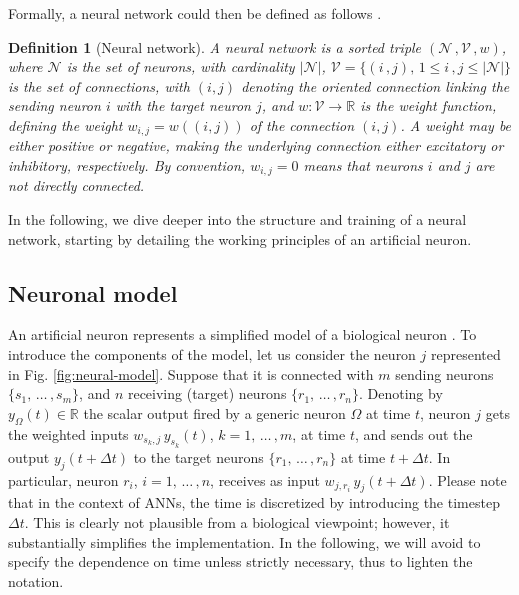 \documentclass{elsarticle}
\numberwithin{equation}{section}
\theoremstyle{theorem}
\theoremstyle{definition}
\newtheorem{definition}{Definition}[section]
\theoremstyle{remark}
\theoremstyle{proposition}
\numberwithin{figure}{section}
\begin{document}
		Formally, a neural network could then be defined as follows \cite{Kri07}.
		
		\begin{definition}[Neural network]
			\label{def:neural-network}
			\emph{
			A \emph{neural network} is a sorted triple $\left( \mathcal{N} \, , \mathcal{V} \, , w \right)$, where $\mathcal{N}$ is the set of \emph{neurons}, with cardinality $|\mathcal{N}|$, $\mathcal{V} = \big\lbrace (i \, , j), \, 1 \leq i \, , j  \leq |\mathcal{N}| \big\rbrace$ is the set of \emph{connections}, with $(i,j)$ denoting the oriented connection linking the sending neuron $i$ with the target neuron $j$, and $w : \mathcal{V} \rightarrow \mathbb{R}$ is the \emph{weight function}, defining the weight $w_{i,j} = w((i,j))$ of the connection $(i,j)$. A weight may be either positive or negative, making the underlying connection either excitatory or inhibitory, respectively. By convention, $w_{i,j} = 0$ means that neurons $i$ and $j$ are not directly connected.
			}
		\end{definition}
		
		\noindent In the following, we dive deeper into the structure and training of a neural network, starting by detailing the working principles of an artificial neuron.  
		
				
											
	\subsection{Neuronal model}
	\label{section:Neuronal model}
	
		An artificial neuron represents a simplified model of a biological neuron \cite{Kri07}. To introduce the components of the model, let us consider the neuron $j$ represented in Fig. \ref{fig:neural-model}. Suppose that it is connected with $m$ sending neurons $\big\lbrace s_1, \, \ldots \, , s_m \big\rbrace$, and $n$ receiving (target) neurons $\big\lbrace r_1, \, \ldots \, , r_n \big\rbrace$. Denoting by $y_{\Omega}(t) \in \mathbb{R}$ the scalar output fired by a generic neuron $\Omega$ at time $t$, neuron $j$ gets the weighted inputs $w_{s_k,j} \, y_{s_k}(t)$, $k = 1, \, \ldots \, , m$, at time $t$, and sends out the output $y_j(t + \Delta t)$ to the target neurons $\big\lbrace r_1, \, \ldots \, , r_n \big\rbrace$ at time $t + \Delta t$. In particular, neuron $r_i$, $i = 1, \, \ldots \, , n$, receives as input $w_{j,r_i} \, y_j(t + \Delta t)$. Please note that in the context of ANNs, the time is discretized by introducing the timestep $\Delta t$. This is clearly not plausible from a biological viewpoint; however, it substantially simplifies the implementation. In the following, we will avoid to specify the dependence on time unless strictly necessary, thus to lighten the notation.
		
\end{document}

